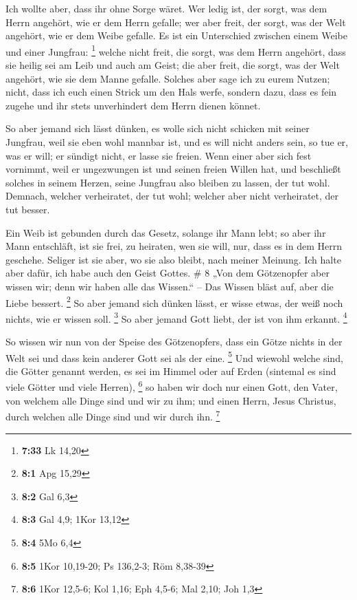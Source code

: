  Ich wollte aber, dass ihr ohne Sorge wäret. Wer ledig
ist, der sorgt, was dem Herrn angehört, wie er dem Herrn gefalle;
 wer aber freit, der sorgt, was der Welt angehört, wie er
dem Weibe gefalle. Es ist ein Unterschied zwischen einem Weibe und einer
Jungfrau: \footnote{\textbf{7:33} Lk 14,20}  welche nicht
freit, die sorgt, was dem Herrn angehört, dass sie heilig sei am Leib
und auch am Geist; die aber freit, die sorgt, was der Welt angehört, wie
sie dem Manne gefalle.  Solches aber sage ich zu eurem
Nutzen; nicht, dass ich euch einen Strick um den Hals werfe, sondern
dazu, dass es fein zugehe und ihr stets unverhindert dem Herrn dienen
könnet.

 So aber jemand sich lässt dünken, es wolle sich nicht
schicken mit seiner Jungfrau, weil sie eben wohl mannbar ist, und es
will nicht anders sein, so tue er, was er will; er sündigt nicht, er
lasse sie freien.  Wenn einer aber sich fest vornimmt,
weil er ungezwungen ist und seinen freien Willen hat, und beschließt
solches in seinem Herzen, seine Jungfrau also bleiben zu lassen, der tut
wohl.  Demnach, welcher verheiratet, der tut wohl;
welcher aber nicht verheiratet, der tut besser.

 Ein Weib ist gebunden durch das Gesetz, solange ihr Mann
lebt; so aber ihr Mann entschläft, ist sie frei, zu heiraten, wen sie
will, nur, dass es in dem Herrn geschehe.  Seliger ist
sie aber, wo sie also bleibt, nach meiner Meinung. Ich halte aber dafür,
ich habe auch den Geist Gottes. \# 8  „Von dem Götzenopfer
aber wissen wir; denn wir haben alle das Wissen.`` -- Das Wissen bläst
auf, aber die Liebe bessert. \footnote{\textbf{8:1} Apg 15,29}
 So aber jemand sich dünken lässt, er wisse etwas, der
weiß noch nichts, wie er wissen soll. \footnote{\textbf{8:2} Gal 6,3}
 So aber jemand Gott liebt, der ist von ihm erkannt.
\footnote{\textbf{8:3} Gal 4,9; 1Kor 13,12}

 So wissen wir nun von der Speise des Götzenopfers, dass
ein Götze nichts in der Welt sei und dass kein anderer Gott sei als der
eine. \footnote{\textbf{8:4} 5Mo 6,4}  Und wiewohl welche
sind, die Götter genannt werden, es sei im Himmel oder auf Erden
(sintemal es sind viele Götter und viele Herren), \footnote{\textbf{8:5}
  1Kor 10,19-20; Ps 136,2-3; Röm 8,38-39}  so haben wir
doch nur einen Gott, den Vater, von welchem alle Dinge sind und wir zu
ihm; und einen Herrn, Jesus Christus, durch welchen alle Dinge sind und
wir durch ihn. \footnote{\textbf{8:6} 1Kor 12,5-6; Kol 1,16; Eph 4,5-6;
  Mal 2,10; Joh 1,3}

